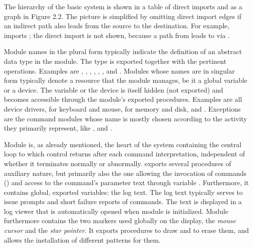 The hierarchy of the basic system is shown in a table of direct
imports and as a graph in Figure 2.2. The picture is simplified by
omitting direct import edges if an indirect path also leads from the
source to the destination. For example,  imports ; the
direct import is not shown, because a path from  leads to 
via .


Module names in the plural form typically indicate the definition of
an abstract data type in the module. The type is exported together
with the pertinent operations. Examples are , , , , , , and . Modules whose names are in
singular form typically denote a resource that the module manages, be
it a global variable or a device. The variable or the device is itself
hidden (not exported) and becomes accessible through the module's
exported procedures. Examples are all device drivers, 
for keyboard and mouse,  for memory and disk, and . Exceptions are the command modules whose name is mostly
chosen according to the activity they primarily represent, like , and .

Module  is, as already mentioned, the heart of the system
containing the central loop to which control returns after each
command interpretation, independent of whether it terminates normally
or abnormally.  exports several procedures of auxiliary nature,
but primarily also the one allowing the invocation of commands ()
and access to the command's parameter text through variable
. Furthermore, it contains global, exported variables: the
log text. The log text typically serves to issue prompts and short
failure reports of commands. The text is displayed in a log viewer
that is automatically opened when module  is initialized. Module
 furthermore contains the two markers used globally on the
display, the \emph{mouse cursor} and the \emph{star pointer}. It exports procedures
to draw and to erase them, and allows the installation of different
patterns for them.

